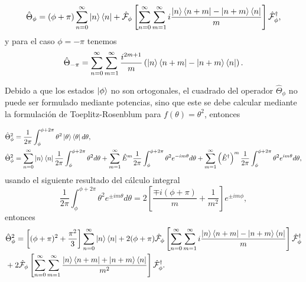         \begin{equation}
            \hat{\Theta}_\phi = (\phi + \pi) \sum_{n=0}^\infty \ket{n}\bra{n} + \hat{\mathcal{F}}_\phi \left[ \sum_{n=0}^\infty\sum_{m=1}^\infty i \frac{\ket{n}\bra{n+m} - \ket{n+m}\bra{n}}{m} \right]\hat{\mathcal{F}}_\phi^\dagger,
        \end{equation}
        y para el caso $\phi = - \pi$ tenemos
        \begin{equation}
            \hat{\Theta}_{-\pi} = \sum_{n=0}^\infty \sum_{m=1}^\infty \frac{i^{2m+1}}{m}\left( \ket{n}\bra{n+m} - \ket{n+m}\bra{n} \right).
        \end{equation}

        Debido a que los estados $\ket{\phi}$ no son ortogonales, el cuadrado del operador $\hat{\Theta}_\phi$ no puede ser formulado mediante potencias, sino que este se debe calcular mediante la formulación de Toeplitz-Rosenblum para $f(\theta) = \theta^2$, entonces

        \begin{align}
            & \hat{\Theta}_\phi^2 = \frac{1}{2\pi}\int_\phi^{\phi+2\pi} \theta^2 \ket{\theta}\bra{\theta}d\theta,\\
            & \hat{\Theta}_\phi^2 = \sum_{n=0}^\infty \ket{n}\bra{n}\frac{1}{2\pi}\int_\phi^{\phi+2\pi}\theta^2 d\theta + \sum_{m=1}^\infty \hat{E}^m \frac{1}{2\pi}\int_\phi^{\phi+2\pi} \theta^2 e^{-im\theta}d\theta + \sum_{m=1}^\infty\left( \hat{E}^\dagger \right)^m\frac{1}{2\pi}\int_\phi^{\phi+2\pi}\theta^2e^{im\theta}d\theta,
        \end{align}
        usando el siguiente resultado del cálculo integral
        \begin{equation}
            \frac{1}{2\pi}\int_\phi^{\phi+2\pi}\theta^2 e^{\pm im\theta}d\theta = 2 \left[ \frac{\mp i (\phi+\pi)}{m}+ \frac{1}{m^2} \right]e^{\pm i m\phi},
        \end{equation}
        entonces
        \begin{align}
            & \hat{\Theta}_\phi^2 = \left[ (\phi+\pi)^2 + \frac{\pi^2}{3} \right]\sum_{n=0}^\infty\ket{n}\bra{n} + 2(\phi+\pi)\hat{\mathcal{F}}_\phi \left[ \sum_{n=0}^\infty\sum_{m=1}^\infty i \frac{\ket{n}\bra{n+m} -\ket{n+m}\bra{n} }{m} \right]\hat{\mathcal{F}}_\phi^\dagger\\
            &  + 2\hat{\mathcal{F}}_\phi \left[ \sum_{n=0}^\infty\sum_{m=1}^\infty \frac{\ket{n}\bra{n+m} + \ket{n+m}\bra{n}}{m^2} \right]\hat{\mathcal{F}}_\phi^\dagger.
        \end{align}

